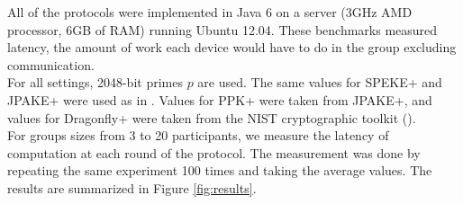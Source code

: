 
All of the protocols were implemented in Java 6 on a server (3GHz AMD processor, 6GB of RAM) running Ubuntu 12.04. These
benchmarks measured latency, the amount of work each device would have to do in the group excluding communication.
\\
For all settings, 2048-bit primes $p$ are used. The same values for SPEKE+ and JPAKE+ were used as in \cite{HaYiChSh15}.
Values for PPK+ were taken from JPAKE+, and values for Dragonfly+ were taken from the NIST cryptographic toolkit (\cite{NIST}).
\\
For groups sizes from 3 to 20 participants, we measure the latency of computation at each round of the protocol. The measurement
was done by repeating the same experiment 100 times and taking the average values. The results are summarized in Figure \ref{fig:results}.


